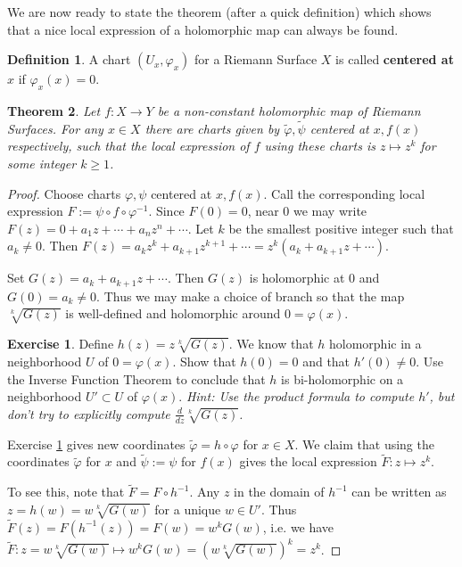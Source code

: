 \documentclass[12pt]{book}%
\theoremstyle{plain}
\newtheorem{theorem}{Theorem}[section]
\theoremstyle{definition}
\newtheorem{definition}[theorem]{Definition}
\newtheorem{exercise}{Exercise}
\theoremstyle{remark}
\def\to{\rightarrow}
\begin{document}
We are now ready to state the theorem (after a quick definition) which shows that a nice local expression of a holomorphic map can always be found.

\begin{definition}
A chart $(U_x, \varphi_x)$ for a Riemann Surface $X$ is called \textbf{centered at} $x$ if $\varphi_x(x) = 0$.
\end{definition}

\begin{theorem}
\label{zToTheKCharts}
Let $f:X \to Y$ be a non-constant holomorphic map of Riemann Surfaces. For any $x \in X$ there are charts given by $\tilde{\varphi}, \tilde{\psi}$ centered at $x, f(x)$ respectively, such that the local expression of $f$ using these charts is $z \mapsto z^k$ for some integer $k \geq 1$.
\end{theorem}
\begin{proof}
Choose charts $\varphi, \psi$ centered at $x, f(x)$. Call the corresponding local expression $F:= \psi \circ f \circ \varphi^{-1}$. Since $F(0)=0$, near $0$ we may write $F(z) = 0 + a_1 z + \cdots + a_n z^n + \cdots$. Let $k$ be the smallest positive integer such that $a_k \neq 0$. Then $F(z) = a_k z^k + a_{k+1} z^{k+1} + \cdots = z^k(a_k + a_{k+1} z + \cdots )$. 

Set $G(z) = a_k + a_{k+1} z + \cdots$. Then $G(z)$ is holomorphic at $0$ and $G(0) = a_k \neq 0$. Thus we may make a  choice of branch so that the map $\sqrt[k]{G(z)}$ is well-defined and holomorphic around $0=\varphi(x)$.

\begin{exercise}
\label{kthRootChart}
Define $h(z) = z\sqrt[k]{G(z)}$. We know that $h$ holomorphic in a neighborhood $U$ of $0=\varphi(x)$. Show that $h(0) = 0$ and that $h'(0) \neq 0$. Use the Inverse Function Theorem to conclude that $h$ is bi-holomorphic on a neighborhood $U' \subset U$ of $\varphi(x)$. \textit{Hint: Use the product formula to compute $h'$, but don't try to explicitly compute $\frac{d}{dz} \sqrt[k]{G(z)}$.}
\end{exercise}

Exercise \ref{kthRootChart} gives new coordinates $\tilde{\varphi} = h \circ \varphi$ for $x\in X$. We claim that using the coordinates $\tilde{\varphi}$ for $x$ and $\tilde{\psi}:=\psi$ for $f(x)$ gives the local expression $\tilde{F}:z \mapsto z^k$.

\begin{figure}
\label{zToTheKChartsFigure}
\end{figure}

To see this, note that $\tilde{F} = F \circ h^{-1}$. Any $z$ in the domain of $h^{-1}$ can be written as $z=h(w)=w\sqrt[k]{G(w)}$ for a unique $w\in U'$. Thus $\tilde{F}(z) = F(h^{-1}(z)) = F(w) = w^k G(w)$, i.e. we have $\tilde{F}:z=w\sqrt[k]{G(w)} \mapsto w^k G(w) = (w\sqrt[k]{G(w)})^k = z^k$.
\end{proof}
\end{document}
